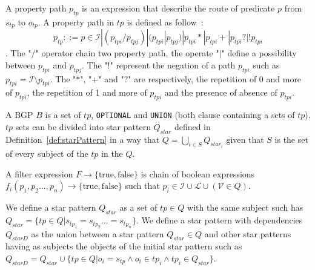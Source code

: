 \begin{definition}\label{def:propertyPath}
   A property path $p_{tp}$ is an expression that describe the route of predicate $p$ from $s_{tp}$ to $o_{tp}$.
   A property path in $tp$ is defined as follow~:
   \begin{equation}
    p_{tp} ::= p \in \mathcal{I} | (p_{tpi}/p_{tpj}) | (p_{tpi}|p_{tpj}) | p_{tpi}* | p_{tpi}+ | p_{tpi}? | !p_{tpi}
   \end{equation}.
   The "$/$" operator chain two property path, the operate "$|$" define a possibility between $p_{tpi}$ and $p_{tpj}$.
   The "$!$" represent the negation of a path $p_{tpi}$ such as $p_{tpi} = \mathcal{I} \setminus p_{tpi}$.
   The "$*$", "$+$" and "$?$" are respectively, the repetition of 0 and more of $p_{tpi}$, 
   the repetition of 1 and more of $p_{tpi}$ and the presence of absence of $p_{tpi}$.
\end{definition}

\begin{definition}[BGP]\label{def:bgp}
 A BGP $B$ is a set of $tp$, \texttt{OPTIONAL} and \texttt{UNION} (both clause containing a sets of $tp$).
 $tp$ sets can be divided into star pattern $Q_{star}$ defined in Definition~\ref{def:starPattern} in a way 
 that $Q = \bigcup_{i\in S} Q_{star_i}$ given that $S$ is the set of every subject of the $tp$ in the $Q$.
\end{definition}

\begin{definition}\label{def:filterExpression}
    A filter expression $F \rightarrow \{\mathrm{true}, \mathrm{false}\}$ is chain of boolean expressions $f_i(p_1, p_2...,p_n) \rightarrow \{\mathrm{true}, \mathrm{false}\}$ such that 
    $p_i \in \mathcal{I} \cup \mathcal{L} \cup (\mathcal{V}\in Q)$.
\end{definition}

\begin{definition}\label{def:starPattern}
We define a star pattern $Q_{star}$ as a set of $tp \in Q$ with the same subject such has $Q_{star} = \{ tp\in Q| s_{tp_1} = s_{tp_2} ... = s_{tp_n}\}$.
We define a star pattern with dependencies $Q_{starD}$ as the union between a star pattern $Q_{star} \in Q$ and other star patterns having as subjects
the objects of the initial star pattern such as $Q_{starD} = Q_{star} \cup \{tp \in Q| o_{i} = s_{tp} \land o_{i}\in tp_i \land tp_i  \in Q_{star}\}$.
\end{definition}

